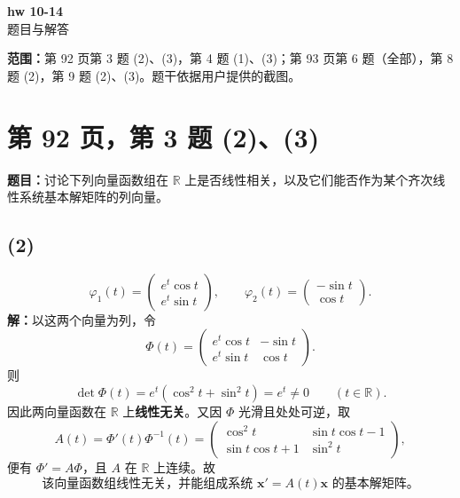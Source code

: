 \documentclass[11pt,a4paper]{ctexart}
\newcommand{\R}{\mathbb R}
\newcommand{\xx}{\boldsymbol{x}}
\begin{document}
\begin{center}{\LARGE\bfseries hw 10-14}\\[7pt]题目与解答\end{center}
\textbf{范围：}第 92 页第 3 题 (2)、(3)，第 4 题 (1)、(3)；第 93 页第 6 题（全部），第 8 题 (2)，第 9 题 (2)、(3)。题干依据用户提供的截图。

\section*{第 92 页，第 3 题 (2)、(3)}
\textbf{题目：}讨论下列向量函数组在 $\R$ 上是否线性相关，以及它们能否作为某个齐次线性系统基本解矩阵的列向量。

\subsection*{(2)}
\[
\varphi_1(t)=\begin{pmatrix}e^t\cos t\\e^t\sin t\end{pmatrix},\qquad
\varphi_2(t)=\begin{pmatrix}-\sin t\\\cos t\end{pmatrix}.
\]
\textbf{解：}以这两个向量为列，令
\[
\Phi(t)=\begin{pmatrix}e^t\cos t&-\sin t\\e^t\sin t&\cos t\end{pmatrix}.
\]
则
\[
\det\Phi(t)=e^t(\cos^2t+\sin^2t)=e^t\ne0\qquad(t\in\R).
\]
因此两向量函数在 $\R$ 上\textbf{线性无关}。又因 $\Phi$ 光滑且处处可逆，取
\[
A(t)=\Phi'(t)\Phi^{-1}(t)
=\begin{pmatrix}
\cos^2t&\sin t\cos t-1\\
\sin t\cos t+1&\sin^2t
\end{pmatrix},
\]
便有 $\Phi'=A\Phi$，且 $A$ 在 $\R$ 上连续。故
\[
\boxed{\text{该向量函数组线性无关，并能组成系统 }\xx'=A(t)\xx\text{ 的基本解矩阵。}}
\]
\end{document}
